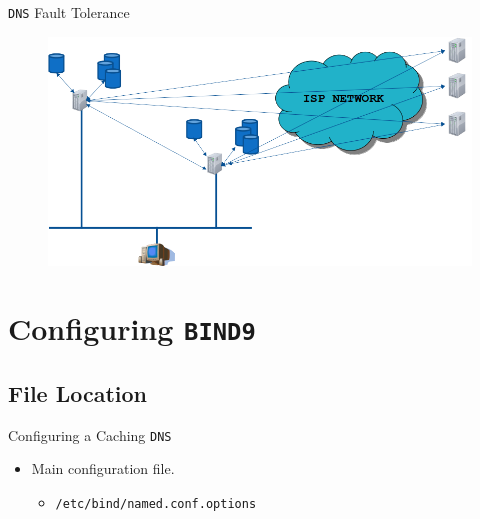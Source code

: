 \documentclass{beamer}
\begin{document}
\begin{frame}{\texttt{DNS} Fault Tolerance}
  \begin{figure}
    \begin{center}
      \includegraphics[width=1\linewidth]{faulttolerance.png}
    \end{center}
  \end{figure}
\end{frame}

\section{Configuring \texttt{BIND9}}
\subsection{File Location}
\begin{frame}{Configuring a Caching \texttt{DNS}}
  \begin{itemize}
    \item Main configuration file.
      \begin{itemize}
        \item \texttt{/etc/bind/named.conf.options}
      \end{itemize}
  \end{itemize}
\end{frame}
\end{document}
